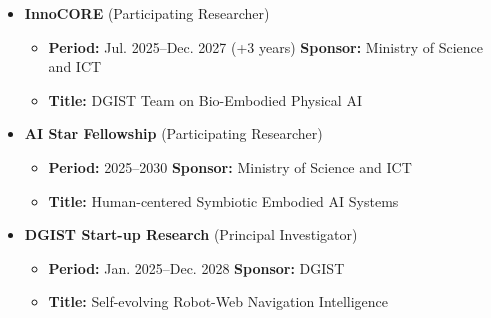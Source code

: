 \documentclass[10pt,a4paper]{article}
\begin{document}
\begin{itemize}[leftmargin=4.5mm,itemsep=4pt]
\begin{itemize}[label=--,leftmargin=5mm,itemsep=0pt,topsep=1pt]
  \item \textbf{Center:} TransHuman Robotics Research Center, Robotics and Mechatronics Research Institute of DGIST
  \end{itemize}
\item \textbf{InnoCORE} (Participating Researcher)
  \begin{itemize}[label=--,leftmargin=5mm,itemsep=0pt,topsep=1pt]
  \item \textbf{Period:} Jul. 2025--Dec. 2027 (+3 years) \quad \textbf{Sponsor:} Ministry of Science and ICT
  \item \textbf{Title:} DGIST Team on Bio-Embodied Physical AI
  \end{itemize}
\item \textbf{AI Star Fellowship} (Participating Researcher)
  \begin{itemize}[label=--,leftmargin=5mm,itemsep=0pt,topsep=1pt]
  \item \textbf{Period:} 2025--2030 \quad \textbf{Sponsor:} Ministry of Science and ICT
  \item \textbf{Title:} Human-centered Symbiotic Embodied AI Systems
  \end{itemize}
\item \textbf{DGIST Start-up Research} (Principal Investigator)
  \begin{itemize}[label=--,leftmargin=5mm,itemsep=0pt,topsep=1pt]
  \item \textbf{Period:} Jan. 2025--Dec. 2028 \quad \textbf{Sponsor:} DGIST
  \item \textbf{Title:} Self-evolving Robot-Web Navigation Intelligence
  \end{itemize}
\end{itemize}
\end{document}
